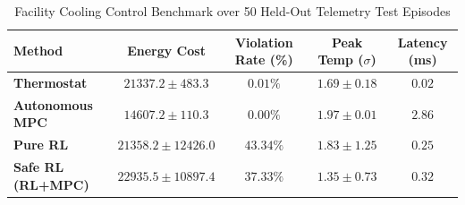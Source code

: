 \begin{table}[h]
\centering
\caption{Facility Cooling Control Benchmark over 50 Held-Out Telemetry Test Episodes}
\label{tab:facility_benchmark}
\small
\begin{tabular}{lcccc}
\hline
\textbf{Method} & \textbf{Energy Cost} & \textbf{Violation Rate (\%)} & \textbf{Peak Temp ($\sigma$)} & \textbf{Latency (ms)} \\
\hline
\textbf{Thermostat} & $21337.2 \pm 483.3$ & $0.01\%$ & $1.69 \pm 0.18$ & $0.02$ \\
\textbf{Autonomous MPC} & $14607.2 \pm 110.3$ & $0.00\%$ & $1.97 \pm 0.01$ & $2.86$ \\
\textbf{Pure RL} & $21358.2 \pm 12426.0$ & $43.34\%$ & $1.83 \pm 1.25$ & $0.25$ \\
\textbf{Safe RL (RL+MPC)} & $22935.5 \pm 10897.4$ & $37.33\%$ & $1.35 \pm 0.73$ & $0.32$ \\
\hline
\end{tabular}
\end{table}
